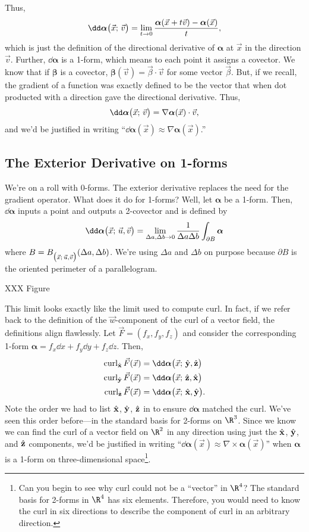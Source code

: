 Thus,
\[
	\dd \bm\alpha\formarg{\vec x}{\vec v}
	= \lim_{t\to 0} \frac{\bm\alpha(\vec x+t\vec v) - \bm\alpha(\vec x)}{t},
\]
which is just the definition of the directional derivative of $\bm\alpha$ at $\vec x$
in the direction $\vec v$.  Further, $\dd \bm\alpha$ is a 1-form, which
means to each point it assigns a covector.  We know that if $\bm\beta$ is a covector,
$\bm\beta(\vec v) = \vec \beta \cdot \vec v$ for some vector $\vec \beta$.
But, if we recall, the gradient of a function was exactly defined to be the
vector that when dot producted with a direction gave the directional derivative.
Thus,
\[
	\dd \bm\alpha\formarg{\vec x}{\vec v} = \nabla \bm\alpha(\vec x)\cdot \vec v,
\]
and we'd be justified in writing ``$\dd \bm\alpha(\vec x) \approx \nabla \bm\alpha(\vec x)$.''

\subsection{The Exterior Derivative on 1-forms}
We're on a roll with 0-forms.  The exterior derivative replaces the need
for the gradient operator.  What does it do for 1-forms?  Well,
let $\bm\alpha$ be a 1-form.  Then, $\dd \bm\alpha$ inputs a point and outputs
a 2-covector and is defined by 
\[
	\dd \bm\alpha\formarg{\vec x}{\vec u,\vec v}
	= \lim_{\Delta a,\Delta b\to 0} \frac{1}{\Delta a\Delta b} \int_{\partial B} \bm\alpha
\]
where $B=B_{\big(\vec x;\, \vec u,\vec v\big)}(\Delta a,\Delta b)$. We're using $\Delta a$
and $\Delta b$ on purpose because $\partial B$ is the oriented perimeter of a parallelogram.

XXX Figure

This limit looks exactly like the limit used to compute curl.  In fact,
if we refer back to the definition of the $\vec w$-component of the curl
of a vector field, the definitions align flawlessly.  Let $\vec F=(f_x,f_y,f_z)$
and consider the corresponding 1-form $\bm\alpha = f_x\dd x+f_y\dd y+f_z\dd z$.
Then,
\begin{align*}
	\Curl_{\xhat} \vec F(\vec x) &= \dd \bm\alpha\formarg{\vec x}{\yhat,\zhat}\\
	\Curl_{\yhat} \vec F(\vec x) &= \dd \bm\alpha\formarg{\vec x}{\zhat,\xhat}\\
	\Curl_{\zhat} \vec F(\vec x) &= \dd \bm\alpha\formarg{\vec x}{\xhat,\yhat}.
\end{align*}
Note the order we had to list ${\hat {\mathbf x}}$, ${\hat {\mathbf y}}$, ${\hat {\mathbf z}}$ in to ensure $\dd\bm\alpha$
matched the curl.  We've seen this order before---in the standard basis for 2-forms
on $\R^3$.  Since we know we can find the curl of a vector field on $\R^2$ in
any direction using just the ${\hat {\mathbf x}}$, ${\hat {\mathbf y}}$, and ${\hat {\mathbf z}}$ components, we'd be
justified in writing ``$\dd \bm\alpha(\vec x) \approx \nabla \times \bm\alpha(\vec x)$''
when $\bm\alpha$ is a 1-form on three-dimensional space\footnote{
Can you begin to see why curl could not be a ``vector'' in $\R^4$?  The standard basis
for 2-forms in $\R^4$ has six elements.  Therefore, you would need to know the
curl in six directions to describe the component of curl in an arbitrary direction.
}.

